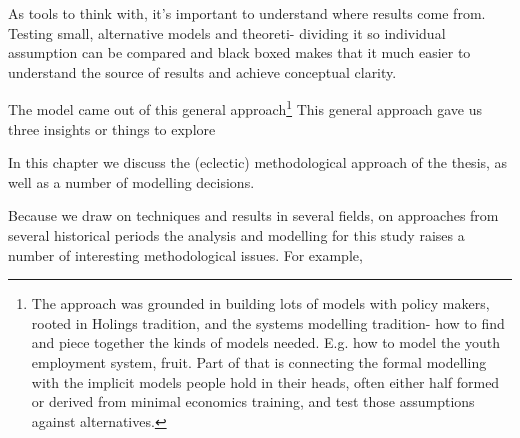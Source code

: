 As tools to think with, it's important to understand where results come from. 
Testing small, alternative models and theoreti- dividing it so individual assumption can be compared and black boxed makes that it much easier to understand the source of results and achieve conceptual clarity.

The model came out of this general approach\footnote{The approach was grounded in building lots of models with policy makers, rooted in Holings tradition, and the systems modelling tradition- how to find and piece together the kinds of models needed. E.g. how to model the youth employment system, fruit. Part of that is connecting the formal modelling with the implicit models people hold in their heads, often either half formed or derived from minimal economics training, and test those assumptions against alternatives.}
This general approach gave us three insights or things to explore

In this chapter we discuss the (eclectic) methodological approach of the thesis, as well as a number of modelling decisions. 

Because we draw on techniques and results in several fields, on approaches from several historical periods %
the analysis and modelling for this study raises a number of interesting methodological issues. For example, 




    


    









